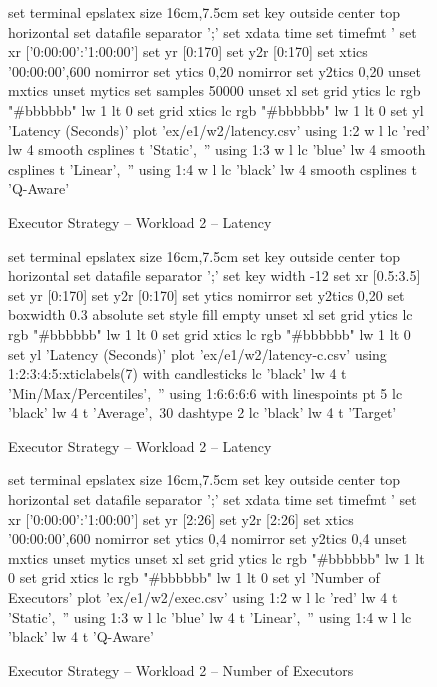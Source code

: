 \begin{figure}[!htbp]
	\centering
	\begin{minipage}[h]{\linewidth}
		\centering
		\begin{gnuplot}[terminal=epslatex, terminaloptions=color colortext]
			set terminal epslatex size 16cm,7.5cm
			set key outside center top horizontal
			set datafile separator ';'
			set xdata time
			set timefmt '%
			set xr ['0:00:00':'1:00:00']
			set yr [0:170]
			set y2r [0:170]
			set xtics '00:00:00',600 nomirror
			set ytics 0,20 nomirror
			set y2tics 0,20
			unset mxtics
			unset mytics
			set samples 50000 
			unset xl
            set grid ytics lc rgb "#bbbbbb" lw 1 lt 0
            set grid xtics lc rgb "#bbbbbb" lw 1 lt 0
			set yl 'Latency (Seconds)'
			plot 'ex/e1/w2/latency.csv' using 1:2 w l lc 'red' lw 4 smooth csplines t 'Static',\
			'' using 1:3 w l lc 'blue' lw 4 smooth csplines t 'Linear',\
			'' using 1:4 w l lc 'black' lw 4 smooth csplines t 'Q-Aware'
		\end{gnuplot}
		\caption{Executor Strategy -- Workload 2 -- Latency}
		\label{eval:f:e1:w2:lat}
	\end{minipage}\hfil
	\begin{minipage}[h]{\linewidth}
		\centering
		\begin{gnuplot}[terminal=epslatex, terminaloptions=color colortext]
			set terminal epslatex size 16cm,7.5cm
			set key outside center top horizontal
			set datafile separator ';'
            set key width -12
			set xr [0.5:3.5]
			set yr [0:170]
			set y2r [0:170]
			set ytics nomirror
			set y2tics 0,20
			set boxwidth 0.3 absolute
			set style fill empty
			unset xl
            set grid ytics lc rgb "#bbbbbb" lw 1 lt 0
            set grid xtics lc rgb "#bbbbbb" lw 1 lt 0
			set yl 'Latency (Seconds)'
			plot 'ex/e1/w2/latency-c.csv' using 1:2:3:4:5:xticlabels(7) with candlesticks lc 'black' lw 4 t 'Min/Max/Percentiles',\
			'' using 1:6:6:6:6 with linespoints pt 5 lc 'black' lw 4 t 'Average',\
            30 dashtype 2 lc 'black' lw 4 t 'Target'
		\end{gnuplot}
		\caption{Executor Strategy -- Workload 2 -- Latency}
		\label{eval:f:e1:w2:lat-c}
	\end{minipage}\hfil
	\begin{minipage}[h]{\linewidth}
		\centering
		\begin{gnuplot}[terminal=epslatex, terminaloptions=color colortext]
			set terminal epslatex size 16cm,7.5cm
			set key outside center top horizontal
			set datafile separator ';'
			set xdata time
			set timefmt '%
			set xr ['0:00:00':'1:00:00']
			set yr [2:26]
			set y2r [2:26]
			set xtics '00:00:00',600 nomirror
			set ytics 0,4 nomirror
			set y2tics 0,4
			unset mxtics
			unset mytics
			unset xl
            set grid ytics lc rgb "#bbbbbb" lw 1 lt 0
            set grid xtics lc rgb "#bbbbbb" lw 1 lt 0
			set yl 'Number of Executors'
			plot 'ex/e1/w2/exec.csv' using 1:2 w l lc 'red' lw 4 t 'Static',\
			'' using 1:3 w l lc 'blue' lw 4 t 'Linear',\
			'' using 1:4 w l lc 'black' lw 4 t 'Q-Aware'
		\end{gnuplot}
		\caption{Executor Strategy -- Workload 2 -- Number of Executors}
		\label{eval:f:e1:w2:exec}
	\end{minipage}
\end{figure}
